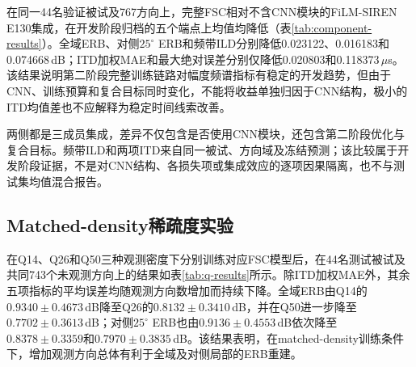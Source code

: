 \documentclass[UTF8,a4paper]{article}
\begin{document}
在同一44名验证被试及767方向上，完整FSC相对不含CNN模块的FiLM-SIREN E130集成，在开发阶段归档的五个端点上均值均降低（表\ref{tab:component-results}）。全域ERB、对侧$25^\circ$ ERB和频带ILD分别降低0.023122、0.016183和0.074668\,dB；ITD加权MAE和最大绝对误差分别仅降低0.020803和0.118373\,$\mu$s。该结果说明第二阶段完整训练链路对幅度频谱指标有稳定的开发趋势，但由于CNN、训练预算和复合目标同时变化，不能将收益单独归因于CNN结构，极小的ITD均值差也不应解释为稳定时间线索改善。



两侧都是三成员集成，差异不仅包含是否使用CNN模块，还包含第二阶段优化与复合目标。频带ILD和两项ITD来自同一被试、方向域及冻结预测；该比较属于开发阶段证据，不是对CNN结构、各损失项或集成效应的逐项因果隔离，也不与测试集均值混合报告。
\FloatBarrier


\subsection{Matched-density稀疏度实验}
\label{sec:sparsity}
在Q14、Q26和Q50三种观测密度下分别训练对应FSC模型后，在44名测试被试及共同743个未观测方向上的结果如表\ref{tab:q-results}所示。除ITD加权MAE外，其余五项指标的平均误差均随观测方向数增加而持续下降。全域ERB由Q14的$0.9340\pm0.4673$\,dB降至Q26的$0.8132\pm0.3410$\,dB，并在Q50进一步降至$0.7702\pm0.3613$\,dB；对侧$25^\circ$ ERB也由$0.9136\pm0.4553$\,dB依次降至$0.8378\pm0.3359$和$0.7970\pm0.3835$\,dB。该结果表明，在matched-density训练条件下，增加观测方向总体有利于全域及对侧局部的ERB重建。
\end{document}
